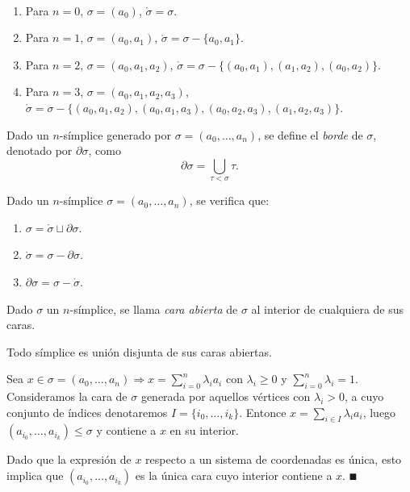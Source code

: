 \documentclass[HS.tex]{subfiles}
\begin{document}
\begin{ej}\
\begin{enumerate}
\item Para $n=0$, $\sigma=(a_0)$, $\mathring{\sigma}=\sigma$.
\item Para $n=1$, $\sigma=(a_0,a_1)$, $\mathring{\sigma}=\sigma-\{a_0,a_1\}$. 
\item Para $n=2$, $\sigma=(a_0,a_1,a_2)$, $\mathring{\sigma}=\sigma-\{(a_0,a_1),(a_1,a_2),(a_0,a_2)\}$.
\item Para $n=3$, $\sigma=(a_0,a_1,a_2,a_3)$, $\mathring{\sigma}=\sigma-\{(a_0,a_1,a_2),(a_0,a_1,a_3),(a_0,a_2,a_3),(a_1,a_2,a_3)\}$.
\end{enumerate}
\end{ej}

\begin{defi}
Dado un $n$-símplice generado por $\sigma=(a_0,\dots, a_n)$, se define el \emph{borde} de $\sigma$, denotado por $\partial\sigma$, como 
$$\partial\sigma=\bigcup_{\tau<\sigma}\tau.$$
\end{defi}

\begin{prop}
Dado un $n$-símplice $\sigma=(a_0,\dots, a_n)$, se verifica que:
\begin{enumerate}
\item $\sigma=\mathring{\sigma}\sqcup\partial\sigma$.
\item $\mathring{\sigma}=\sigma-\partial\sigma$.
\item $\partial\sigma=\sigma-\mathring{\sigma}$.
\end{enumerate}
\end{prop}

\begin{defi}
Dado $\sigma$ un $n$-símplice, se llama \emph{cara abierta} de $\sigma$ al interior de cualquiera de sus caras.
\end{defi}
\begin{prop}
Todo símplice es unión disjunta de sus caras abiertas.
\end{prop}
\begin{dem}
Sea $x\in\sigma=(a_0,\dots,a_n)\Rightarrow x=\sum_{i=0}^n\lambda_ia_i$ con $\lambda_i\geq 0$ y $\sum_{i=0}^n\lambda_i=1$. Consideramos la cara de $\sigma$ generada por aquellos vértices con $\lambda_i>0$, a cuyo conjunto de índices denotaremos $I=\{i_0,\dots, i_k\}$. Entonce $x=\sum_{i\in I}\lambda_ia_i$, luego $(a_{i_0},\dots,a_{i_k})\leq\sigma$ y contiene a $x$ en su interior. 

Dado que la expresión de $x$ respecto a un sistema de coordenadas es única, esto implica que $(a_{i_0},\dots,a_{i_k})$ es la única cara cuyo interior contiene a $x$.
$\QED$
\end{dem}
\end{document}
